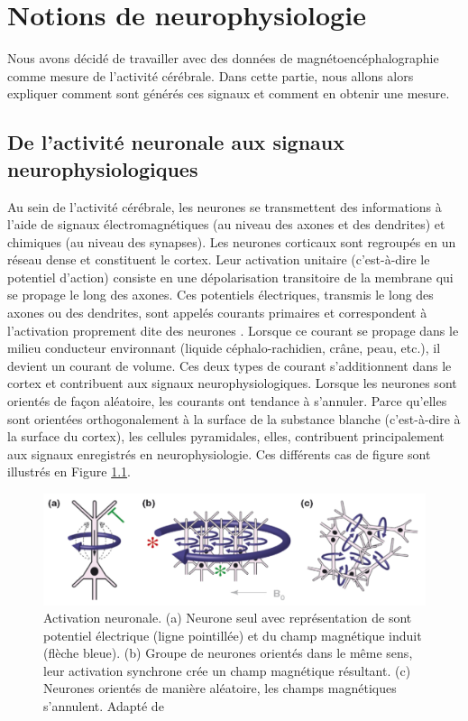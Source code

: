 \chapter{Notions de neurophysiologie}

Nous avons décidé de travailler avec des données de magnétoencéphalographie comme mesure de l'activité cérébrale. Dans cette partie, nous allons alors expliquer comment sont générés ces signaux et comment en obtenir une mesure.

\section{De l'activité neuronale aux signaux neurophysiologiques}

Au sein de l'activité cérébrale, les neurones se transmettent des informations à l'aide de signaux électromagnétiques (au niveau des axones et des dendrites) et chimiques (au niveau des synapses). Les neurones corticaux sont regroupés en un réseau dense et constituent le cortex. Leur activation unitaire (c'est-à-dire le potentiel d'action) consiste en une dépolarisation transitoire de la membrane qui se propage le long des axones. Ces potentiels électriques, transmis le long des axones ou des dendrites, sont appelés courants primaires et correspondent à l'activation proprement dite des neurones \cite{5}. Lorsque ce courant se propage dans le milieu conducteur environnant (liquide céphalo-rachidien, crâne, peau, etc.), il devient un courant de volume. Ces deux types de courant s'additionnent dans le cortex et contribuent aux signaux neurophysiologiques. Lorsque les neurones sont orientés de façon aléatoire, les courants ont tendance à s'annuler. Parce qu'elles sont orientées orthogonalement à la surface de la substance blanche (c'est-à-dire à la surface du cortex), les cellules pyramidales, elles, contribuent principalement aux signaux enregistrés en neurophysiologie. Ces différents cas de figure sont illustrés en Figure \ref{fig1.1}.

\begin{figure}[!ht]
    \centering
    \includegraphics[width=12cm]{activation_neurones.png}
    \caption{Activation neuronale. (a) Neurone seul avec représentation de sont potentiel électrique (ligne pointillée) et du champ magnétique induit (flèche bleue). (b) Groupe de neurones orientés dans le même sens, leur activation synchrone crée un champ magnétique résultant. (c) Neurones orientés de manière aléatoire, les champs magnétiques s'annulent. Adapté de \cite{10}}
    \label{fig1.1}
\end{figure}

